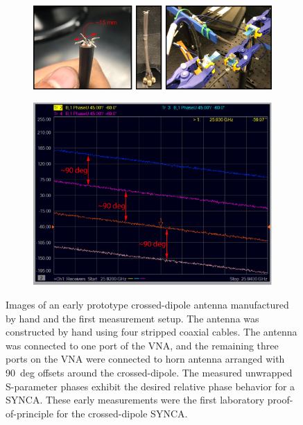 \begin{figure}[htbp]
    \centering
    \begin{subfigure}{1.0\textwidth}
        \includegraphics*[width=1.0\textwidth]{figs/Chapter-5/230801_first_cross_dipole.png}
    \end{subfigure}
    \begin{subfigure}{0.7\textwidth}
        \includegraphics*[width=1.0\textwidth]{figs/Chapter-5/230801_vna_first_cross_dipole.png}
    \end{subfigure}
    \caption{\label{fig:chap5-first-dipole}Images of an early prototype crossed-dipole antenna manufactured by hand and the first measurement setup. The antenna was constructed by hand using four stripped coaxial cables. The antenna was connected to one port of the VNA, and the remaining three ports on the VNA were connected to horn antenna arranged with 90~deg offsets around the crossed-dipole. The measured unwrapped S-parameter phases exhibit the desired relative phase behavior for a SYNCA. These early measurements were the first laboratory proof-of-principle for the crossed-dipole SYNCA.}
\end{figure}


